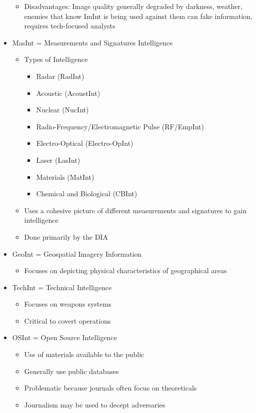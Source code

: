 \documentclass[11pt]{article}
\begin{document}
\begin{itemize}
\begin{itemize}
\item Disadvantages: Image quality generally degraded by darkness, weather, enemies that know ImInt is being used against them can fake information, requires tech-focused analysts
\end{itemize}
\item MasInt = Measurements and Signatures Intelligence
\begin{itemize}
\item Types of Intelligence
\begin{itemize}
\item Radar (RadInt)
\item Acoustic (AcoustInt)
\item Nuclear (NucInt)
\item Radio-Frequency/Electromagnetic Pulse (RF/EmpInt)
\item Electro-Optical (Electro-OpInt)
\item Laser (LasInt)
\item Materials (MatInt)
\item Chemical and Biological (CBInt)
\end{itemize}
\item Uses a cohesive picture of different measurements and signatures to gain intelligence
\item Done primarily by the DIA
\end{itemize}
\item GeoInt = Geospatial Imagery Information
\begin{itemize}
\item Focuses on depicting physical characteristics of geographical areas
\end{itemize}
\item TechInt = Technical Intelligence
\begin{itemize}
\item Focuses on weapons systems
\item Critical to covert operations
\end{itemize}
\item OSInt = Open Source Intelligence
\begin{itemize}
\item Use of materials available to the public
\item Generally use public databases
\item Problematic because journals often focus on theoreticals
\item Journalism may be used to decept adversaries
\end{itemize}
\end{itemize}
\end{document}
